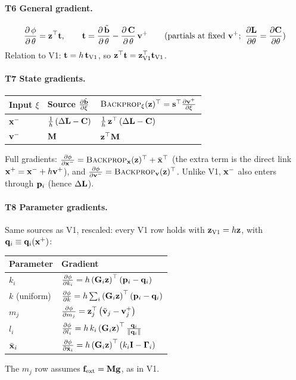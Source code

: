 \paragraph{T6 General gradient.}\mbox{}
\begin{equation*}
    \dfrac{\partial\, \phi}{\partial\, \theta} = \mathbf{z}^\top\mathbf{t},
    \qquad
    \mathbf{t} = \dfrac{\partial\, \tilde{\mathbf{b}}}{\partial\, \theta} - \dfrac{\partial\, \mathbf{C}}{\partial\, \theta}\,\mathbf{v}^+
    \qquad(\text{partials at fixed } \mathbf{v}^+;\ \frac{\partial \mathbf{L}}{\partial \theta} = \frac{\partial \mathbf{C}}{\partial \theta})
\end{equation*}
\noindent Relation to V1: $\mathbf{t} = h\,\mathbf{t}_{\text{V1}}$, so $\mathbf{z}^\top\mathbf{t} = \mathbf{z}_{\text{V1}}^\top\mathbf{t}_{\text{V1}}$.
\paragraph{T7 State gradients.}\mbox{}
\begin{center}
\renewcommand{\arraystretch}{1.6}
\begin{tabular}{lll}
\textbf{Input} $\xi$ & \textbf{Source} $\frac{\partial \tilde{\mathbf{b}}}{\partial \xi}$ & $\textsc{Backprop}_\xi(\mathbf{z})^\top = \mathbf{s}^\top\frac{\partial \mathbf{v}^+}{\partial \xi}$ \\ \hline
$\mathbf{x}^-$ & $\tfrac{1}{h}\left(\Delta\mathbf{L} - \mathbf{C}\right)$ & $\tfrac{1}{h}\,\mathbf{z}^\top\left(\Delta\mathbf{L} - \mathbf{C}\right)$ \\
$\mathbf{v}^-$ & $\mathbf{M}$ & $\mathbf{z}^\top\mathbf{M}$ \\
\end{tabular}
\end{center}
\noindent Full gradients: $\frac{\partial \phi}{\partial \mathbf{x}^-} = \textsc{Backprop}_{\mathbf{x}}(\mathbf{z})^\top + \bar{\mathbf{x}}^\top$ (the extra term is the direct link $\mathbf{x}^+ = \mathbf{x}^- + h\mathbf{v}^+$), and $\frac{\partial \phi}{\partial \mathbf{v}^-} = \textsc{Backprop}_{\mathbf{v}}(\mathbf{z})^\top$. Unlike V1, $\mathbf{x}^-$ also enters through $\mathbf{p}_i$ (hence $\Delta\mathbf{L}$).
\paragraph{T8 Parameter gradients.}\mbox{}
\newline Same sources as V1, rescaled: every V1 row holds with $\mathbf{z}_{\text{V1}} = h\mathbf{z}$, with $\mathbf{q}_i \equiv \mathbf{q}_i(\mathbf{x}^+)$:
\begin{center}
\renewcommand{\arraystretch}{1.7}
\begin{tabular}{ll}
\textbf{Parameter} & \textbf{Gradient} \\ \hline
$k_i$         & $\frac{\partial \phi}{\partial k_i} = h\left(\mathbf{G}_i\mathbf{z}\right)^\top\left(\mathbf{p}_i - \mathbf{q}_i\right)$ \\
$k$ (uniform) & $\frac{\partial \phi}{\partial k} = h\sum_i\left(\mathbf{G}_i\mathbf{z}\right)^\top\left(\mathbf{p}_i - \mathbf{q}_i\right)$ \\
$m_j$         & $\frac{\partial \phi}{\partial m_j} = \mathbf{z}_j^\top\left(\tilde{\mathbf{v}}_j - \mathbf{v}_j^+\right)$ \\
$l_i$         & $\frac{\partial \phi}{\partial l_i} = h\,k_i\left(\mathbf{G}_i\mathbf{z}\right)^\top\tfrac{\mathbf{q}_i}{\left\|\mathbf{q}_i\right\|}$ \\
$\bar{\mathbf{x}}_i$    & $\frac{\partial \phi}{\partial \bar{\mathbf{x}}_i} = h\left(\mathbf{G}_i\mathbf{z}\right)^\top\left(k_i\mathbf{I} - \boldsymbol{\Gamma}_i\right)$ \\
\end{tabular}
\end{center}
\noindent The $m_j$ row assumes $\mathbf{f}_{\text{ext}} = \mathbf{M}\mathbf{g}$, as in V1.
